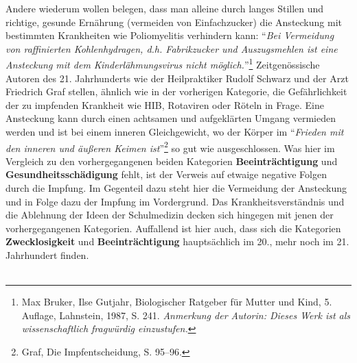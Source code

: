 \documentclass[
    a4paper,
    12pt,
    hyphens,
    chapterprefix=true,
    headheight=33pt,
    footheight=29pt,
    headings=optiontohead,
]{scrartcl}
\begin{document}
{Andere wiederum wollen belegen, dass man alleine durch langes Stillen und richtige, gesunde Ernährung (vermeiden von Einfachzucker) die Ansteckung mit bestimmten Krankheiten wie Poliomyelitis verhindern kann: "`\textit{Bei Vermeidung von raffinierten Kohlenhydragen, d.h. Fabrikzucker und Auszugsmehlen ist eine Ansteckung mit dem Kinderlähmungsvirus nicht möglich.}"'\footnote{Max Bruker, Ilse Gutjahr, Biologischer Ratgeber für Mutter und Kind, 5. Auflage, Lahnstein, 1987, S. 241. \textit{Anmerkung der Autorin: Dieses Werk ist als wissenschaftlich fragwürdig einzustufen.}} Zeitgenössische Autoren des 21. Jahrhunderts wie der Heilpraktiker Rudolf Schwarz und der Arzt Friedrich Graf stellen, ähnlich wie in der vorherigen Kategorie, die Gefährlichkeit der zu impfenden Krankheit wie HIB, Rotaviren oder Röteln in Frage. Eine Ansteckung kann durch einen achtsamen und aufgeklärten Umgang vermieden werden und ist bei einem inneren Gleichgewicht, wo der Körper im "`\textit{Frieden mit den inneren und äußeren Keimen ist}"'\footnote{Graf, Die Impfentscheidung, S. 95--96.} so gut wie ausgeschlossen. Was hier im Vergleich zu den vorhergegangenen beiden Kategorien \textbf{Beeinträchtigung} und \textbf{Gesundheitsschädigung} fehlt, ist der Verweis auf etwaige negative Folgen durch die Impfung. Im Gegenteil dazu steht hier die Vermeidung der Ansteckung und in Folge dazu der Impfung im Vordergrund. Das Krankheitsverständnis und die Ablehnung der Ideen der Schulmedizin decken sich hingegen mit jenen der vorhergegangenen Kategorien. Auffallend ist hier auch, dass sich die Kategorien \textbf{Zwecklosigkeit} und \textbf{Beeinträchtigung} hauptsächlich im 20., mehr noch im 21. Jahrhundert finden. \\
\\
}
\end{document}
